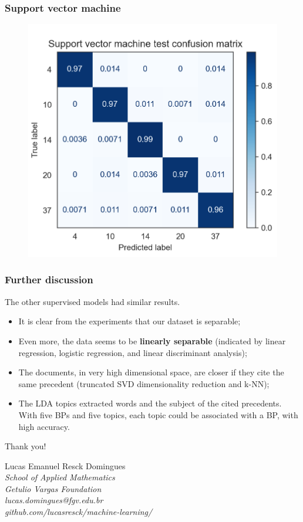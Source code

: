 \documentclass{beamer}
\begin{document}
    \begin{frame}
        \frametitle{Support vector machine}
        \begin{figure}
            \centering
            \includegraphics[width=0.6\linewidth]{svm.png}
        \end{figure}
    \end{frame}

    \begin{frame}
        \frametitle{Further discussion}
        The other supervised models had similar results. \pause

        \begin{itemize}
            \item It is clear from the experiments that our dataset is separable; \pause
            \item Even more, the data seems to be \textbf{linearly separable} (indicated by linear regression, logistic regression, and linear discriminant analysis); \pause
            \item The documents, in very high dimensional space, are closer if they cite the same precedent (truncated SVD dimensionality reduction and k-NN); \pause
            \item The LDA topics extracted words and the subject of the cited precedents. With five BPs and five topics, each topic could be associated with a BP, with high accuracy.
        \end{itemize}
    \end{frame}

    \begin{frame}
        \begin{center}
        {\Huge Thank you!}
        \bigskip

        Lucas Emanuel Resck Domingues \\
        \textit{School of Applied Mathematics} \\
        \textit{Getulio Vargas Foundation} \\
        \textit{lucas.domingues@fgv.edu.br} \\
        \textit{github.com/lucasresck/machine-learning/}
        \end{center}
    \end{frame}

    \nocite{*}
    
    
\end{document}
